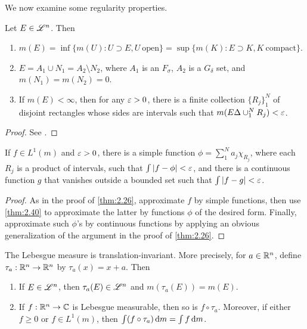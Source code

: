 \documentclass[12pt]{article} %
\begin{document}
We now examine some regularity properties.

\begin{theorem}\label{thm:2.40}
    Let $E \in \mathscr{L}^n$. Then \begin{enumerate}
        \item $m(E) = \inf \{m(U) : U \supset E, U \ \text{open}\} = \sup \{m(K) : E \supset K, K \ \text{compact}\}$.
        \item $E = A_1 \cup N_1 = A_2 \setminus N_2$, where $A_1$ is an $F_\sigma$, $A_2$ is a $G_\delta$ set, and $m(N_1) = m(N_2) = 0$.
        \item If $m(E) < \infty$, then for any $\varepsilon > 0$, there is a finite collection $\{R_j\}_1^N$ of disjoint rectangles whose sides are intervals such that $m(E \Delta \cup_1^N R_j) < \varepsilon$.
    \end{enumerate}
\end{theorem}

\begin{proof}
    See \citet[Theorem~2.40]{folland1999real}.
\end{proof}

\begin{theorem}\label{thm:2.41}
    If $f \in L^1(m)$ and $\varepsilon > 0$, there is a simple function $\phi = \sum_1^N a_j \chi_{R_j}$, where each $R_j$ is a product of intervals, such that $\int |f - \phi| < \varepsilon$, and there is a continuous function $g$ that vanishes outside a bounded set such that $\int |f - g| < \varepsilon$.
\end{theorem}

\begin{proof}
    As in the proof of \cref{thm:2.26}, approximate $f$ by simple functions, then use \cref{thm:2.40} to approximate the latter by functions $\phi$ of the desired form. Finally, approximate such $\phi$'s by continuous functions by applying an obvious generalization of the argument in the proof of \cref{thm:2.26}.
\end{proof}

\begin{theorem}
    The Lebesgue measure is translation-invariant. More precisely, for $a \in \mathbb{R}^n$, define $\tau_a : \mathbb{R}^n \to \mathbb{R}^n$ by $\tau_a(x) = x + a$. Then \begin{enumerate}
        \item If $E \in \mathscr{L}^n$, then $\tau_a(E) \in \mathscr{L}^n$ and $m(\tau_a(E)) = m(E)$.
        \item If $f : \mathbb{R}^n \to \mathbb{C}$ is Lebesgue measurable, then so is $f \circ \tau_a$. Moreover, if either $f \geq 0$ or $f \in L^1(m)$, then $\int (f \circ \tau_a) \, \mathrm{d} m = \int f \, \mathrm{d} m$.
    \end{enumerate}
\end{theorem}
\end{document}
